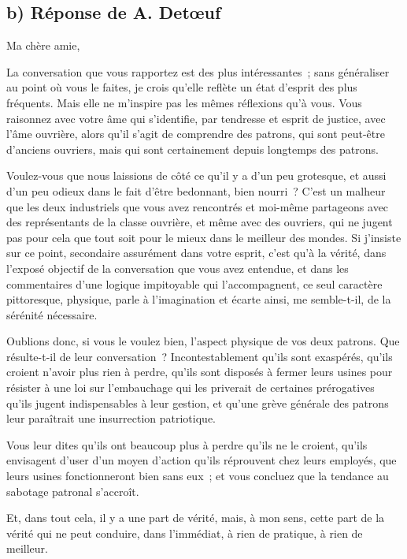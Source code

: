 \documentclass[french,twoside]{book} %
\begin{document}
\subsection[b) Réponse de A. Detœuf]{b) Réponse de A. Detœuf}
\noindent Ma chère amie,\par
La conversation que vous rapportez est des plus intéressantes ; sans généraliser au point où vous le faites, je crois qu'elle reflète un état d'esprit des plus fréquents. Mais elle ne m'inspire pas les mêmes réflexions qu’à vous. Vous raisonnez avec votre âme qui s'identifie, par tendresse et esprit de justice, avec l'âme ouvrière, alors qu'il s'agit de comprendre des patrons, qui sont peut-être d'anciens ouvriers, mais qui sont certainement depuis longtemps des patrons.\par
Voulez-vous que nous laissions de côté ce qu'il y a d'un peu grotesque, et aussi d'un peu odieux dans le fait d'être bedonnant, bien nourri ? C'est un malheur que les deux industriels que vous avez rencontrés et moi-même partageons avec des représentants de la classe ouvrière, et même avec des ouvriers, qui ne jugent pas pour cela que tout soit pour le mieux dans le meilleur des mondes. Si j'insiste sur ce point, secondaire assurément dans votre esprit, c'est qu'à la vérité, dans l'exposé objectif de la conversation que vous avez entendue, et dans les commentaires d'une logique impitoyable qui l'accompagnent, ce seul caractère pittoresque, physique, parle à l'imagination et écarte ainsi, me semble-t-il, de la sérénité nécessaire.\par
Oublions donc, si vous le voulez bien, l'aspect physique de vos deux patrons. Que résulte-t-il de leur conversation ? Incontestablement qu'ils sont exaspérés, qu'ils croient n'avoir plus rien à perdre, qu'ils sont disposés à fermer leurs usines pour résister à une loi sur l'embauchage qui les priverait de certaines prérogatives qu'ils jugent indispensables à leur gestion, et qu'une grève générale des patrons leur paraîtrait une insurrection patriotique.\par
Vous leur dites qu'ils ont beaucoup plus à perdre qu'ils ne le croient, qu'ils envisagent d'user d'un moyen d'action qu'ils réprouvent chez leurs employés, que leurs usines fonctionneront bien sans eux ; et vous concluez que la tendance au sabotage patronal s'accroît.\par
Et, dans tout cela, il y a une part de vérité, mais, à mon sens, cette part de la vérité qui ne peut conduire, dans l'immédiat, à rien de pratique, à rien de meilleur.\par
\end{document}
